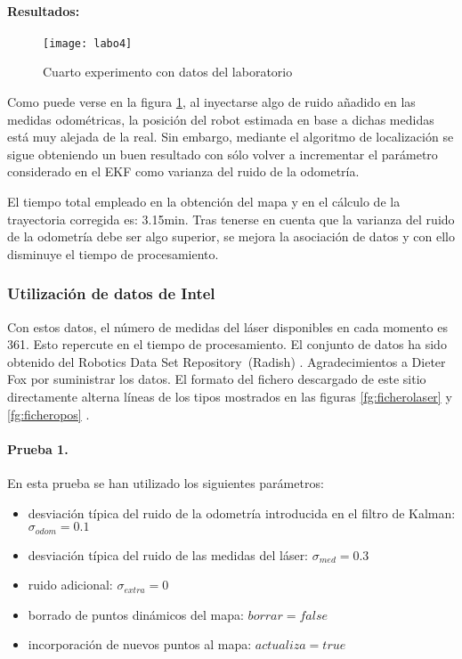 \paragraph{Resultados:}

\begin{figure}[h]
  \centering\texttt{[image: labo4]}\\
  \caption{Cuarto experimento con datos del laboratorio}\label{fg:labo4}
\end{figure}

Como puede verse en la figura \ref{fg:labo4}, al inyectarse algo de ruido añadido en las medidas odométricas, la posición del robot estimada en base a dichas medidas está muy alejada de la real. Sin embargo, mediante el algoritmo de localización se sigue obteniendo un buen resultado con sólo volver a incrementar el parámetro considerado en el EKF como varianza del ruido de la odometría.

El tiempo total empleado en la obtención del mapa y en el cálculo de la trayectoria corregida es: 3.15min. Tras tenerse en cuenta que la varianza del ruido de la odometría debe ser algo superior, se mejora la asociación de datos y con ello disminuye el tiempo de procesamiento.

\clearpage
\subsubsection{Utilización de datos de Intel}

Con estos datos, el número de medidas del láser disponibles en cada momento es 361. Esto repercute en el tiempo de procesamiento. El conjunto de datos ha sido obtenido del Robotics Data Set Repository~(Radish) \cite{Radish}. Agradecimientos a Dieter Fox por suministrar los datos. El formato del fichero descargado de este sitio directamente alterna líneas de los tipos mostrados en las figuras \ref{fg:ficherolaser} y \ref{fg:ficheropos} .

\paragraph{Prueba 1.}
En esta prueba se han utilizado los siguientes parámetros:
\begin{itemize}
  \item desviación típica del ruido de la odometría introducida en el filtro de Kalman: $\sigma_{odom} = 0.1$
  \item desviación típica del ruido de las medidas del láser: $\sigma_{med} = 0.3$
  \item ruido adicional: $\sigma_{extra} = 0$
  \item borrado de puntos dinámicos del mapa: $borrar = false$
  \item incorporación de nuevos puntos al mapa: $actualiza = true$
\end{itemize}


